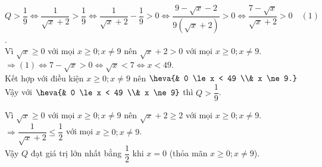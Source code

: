 \begin{bt}
{\begin{cacy}
\item $Q > \dfrac{1}{9} \Leftrightarrow \dfrac{1}{\sqrt{x}+2} > \dfrac{1}{9} \Leftrightarrow \dfrac{1}{\sqrt{x}+2} - \dfrac{1}{9} > 0 \Leftrightarrow \dfrac{9-\sqrt{x}-2}{9\left(\sqrt{x}+2\right)} > 0 \Leftrightarrow \dfrac{7-\sqrt{x}}{\sqrt{x}+2} > 0 \quad (1)$.\\
Vì $\sqrt{x} \ge 0$ với mọi $x \ge 0; x \ne 9$ nên $\sqrt{x}+2 > 0$ với mọi $x \ge 0; x \ne 9$.\\
$\Rightarrow (1) \Leftrightarrow 7-\sqrt{x} > 0 \Leftrightarrow \sqrt{x} < 7 \Leftrightarrow x < 49$.\\
Kết hợp với điều kiện $x \ge 0; x \ne 9$ nên $\heva{& 0 \le x < 49 \\& x \ne 9.}$\\
Vậy với $\heva{& 0 \le x < 49 \\& x \ne 9}$ thì $Q > \dfrac{1}{9}$.

\item Vì $\sqrt{x} \ge 0$ với mọi $x \ge 0; x \ne 9$ nên $\sqrt{x}+2 \ge 2$ với mọi $x \ge 0; x \ne 9$.\\
$\Rightarrow \dfrac{1}{\sqrt{x}+2} \le \dfrac{1}{2}$ với mọi $x \ge 0; x \ne 9$.\\
Vậy $Q$ đạt giá trị lớn nhất bằng $\dfrac{1}{2}$ khi $x = 0$ (thỏa mãn $x \ge 0; x \ne 9$).
\end{cacy}
}
\end{bt}

